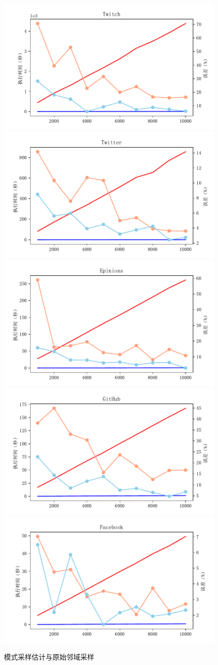 \documentclass[master]{thesis-uestc}
\begin{document}
\begin{figure}
    \includegraphics[width=0.5\linewidth]{pic/samp-cmp-asap/Twitch.pdf}\\
    \includegraphics[width=0.5\linewidth]{pic/samp-cmp-asap/Twitter.pdf}%
    \includegraphics[width=0.5\linewidth]{pic/samp-cmp-asap/Epinions.pdf}\\
    \includegraphics[width=0.5\linewidth]{pic/samp-cmp-asap/GitHub.pdf}%
    \includegraphics[width=0.5\linewidth]{pic/samp-cmp-asap/Facebook.pdf}
    \caption{模式采样估计与原始邻域采样}
    \label{fig:samp-cmp-asap}
\end{figure}
\end{document}
